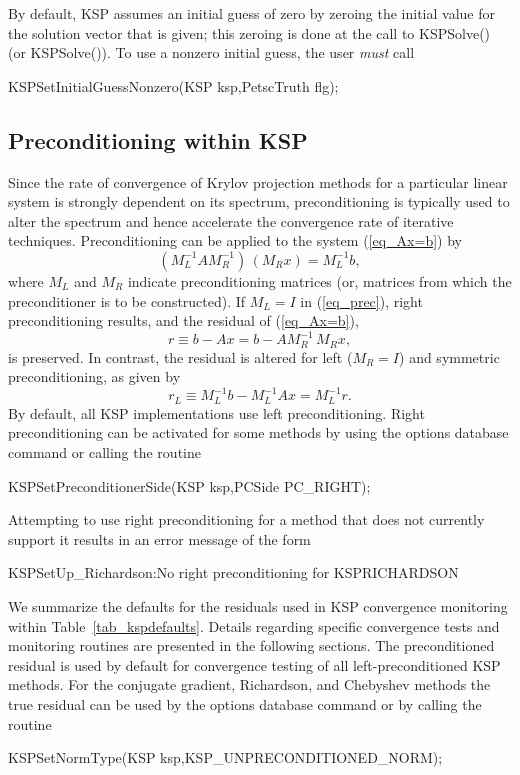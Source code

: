 By default, KSP assumes an initial guess of zero by zeroing the initial 
value for the solution vector that is given; this zeroing is done at the
call to KSPSolve() (or KSPSolve()). To use a nonzero 
initial guess, the user {\em must} call 
\begin{tabbing}
  KSPSetInitialGuessNonzero(KSP ksp,PetscTruth flg);
\end{tabbing}

\subsection{Preconditioning within KSP} 
\label{sec_ksppc}

Since the rate of convergence of Krylov projection methods for a
particular linear system is strongly dependent on its spectrum,
preconditioning is typically used to alter the spectrum and hence
accelerate the convergence rate of iterative techniques.
Preconditioning can be applied to the system (\ref{eq_Ax=b}) by
\begin{equation}
   (M_L^{-1} A M_R^{-1}) \, (M_R x) = M_L^{-1} b,
\label{eq_prec}
\end{equation}
where $ M_L$ and $ M_R $ indicate preconditioning matrices (or, matrices
from which the preconditioner is to be constructed).  If $ M_L = I $
in (\ref{eq_prec}), right preconditioning results, and the
residual of (\ref{eq_Ax=b}),
  \[ r \equiv b - Ax = b - A M_R^{-1} \, M_R x, \]
is preserved.  In contrast, the residual is altered for left 
($ M_R = I $) and symmetric preconditioning, as given by
  \[ r_L \equiv M_L^{-1} b - M_L^{-1} A x = M_L^{-1} r. \]
By default, all KSP implementations use left preconditioning.  
Right preconditioning can be activated for some methods by
using the options database command  or
calling the routine  
\begin{tabbing}
  KSPSetPreconditionerSide(KSP ksp,PCSide PC\_RIGHT);
\end{tabbing}
Attempting to use right preconditioning for a method that
does not currently support it results in an error message of the form
\begin{tabbing}
   KSPSetUp\_Richardson:No right preconditioning for KSPRICHARDSON
\end{tabbing}

We summarize the defaults for the residuals used in KSP convergence
monitoring within Table~\ref{tab_kspdefaults}.  Details regarding
specific convergence tests and monitoring routines are presented in
the following sections.  The preconditioned residual is used by
default for convergence testing of all left-preconditioned KSP
methods. For the conjugate gradient, Richardson, and
Chebyshev methods the true residual can be used by
the options database command  or by calling the routine
\begin{tabbing}
  KSPSetNormType(KSP ksp,KSP\_UNPRECONDITIONED\_NORM);
\end{tabbing}

